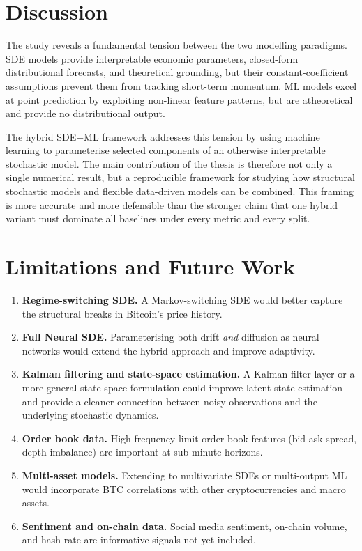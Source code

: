 \documentclass[12pt, a4paper, oneside]{report}
\theoremstyle{plain}
\theoremstyle{definition}
\theoremstyle{remark}
\begin{document}
\section*{Discussion}

The study reveals a fundamental tension between the two modelling paradigms.
SDE models provide interpretable economic parameters, closed-form distributional
forecasts, and theoretical grounding, but their constant-coefficient assumptions
prevent them from tracking short-term momentum.  ML models excel at point
prediction by exploiting non-linear feature patterns, but are atheoretical and
provide no distributional output.

The hybrid SDE+ML framework addresses this tension by using machine learning to
parameterise selected components of an otherwise interpretable stochastic model.
The main contribution of the thesis is therefore not only a single numerical
result, but a reproducible framework for studying how structural stochastic
models and flexible data-driven models can be combined.  This framing is more
accurate and more defensible than the stronger claim that one hybrid variant
must dominate all baselines under every metric and every split.

\section*{Limitations and Future Work}

\begin{enumerate}[leftmargin=1.25cm, label=\arabic*.]
  \item \textbf{Regime-switching SDE.}  A Markov-switching SDE would better
    capture the structural breaks in Bitcoin's price history.
  \item \textbf{Full Neural SDE.}  Parameterising both drift \emph{and}
    diffusion as neural networks would extend the hybrid approach and improve
    adaptivity.
  \item \textbf{Kalman filtering and state-space estimation.}  A Kalman-filter
    layer or a more general state-space formulation could improve latent-state
    estimation and provide a cleaner connection between noisy observations and
    the underlying stochastic dynamics.
  \item \textbf{Order book data.}  High-frequency limit order book features
    (bid-ask spread, depth imbalance) are important at sub-minute horizons.
  \item \textbf{Multi-asset models.}  Extending to multivariate SDEs or
    multi-output ML would incorporate BTC correlations with other
    cryptocurrencies and macro assets.
  \item \textbf{Sentiment and on-chain data.}  Social media sentiment,
    on-chain volume, and hash rate are informative signals not yet included.
\end{enumerate}

\clearpage
\printbibliography[heading=bibintoc, title={Bibliography}]
\end{document}
